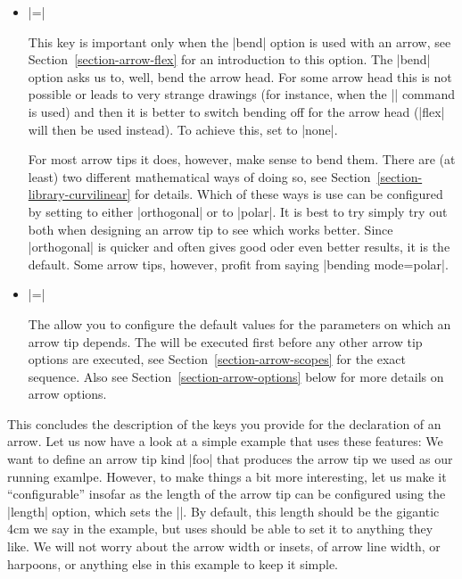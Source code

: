 \begin{command}{\pgfdeclarearrow{}}
\begin{itemize}
  \item {}|=|

    This key is important only when the |bend| option is used with an
    arrow, see Section~\ref{section-arrow-flex} for an introduction to
    this option. The |bend| option asks us to, well, bend the arrow
    head. For some arrow head this is not possible or leads to very
    strange drawings (for instance, when the |\pgftext| command is
    used) and then it is better to switch bending off for the arrow
    head (|flex| will then be used instead). To achieve this, set
     to |none|.

    For most arrow tips it does, however, make sense to bend
    them. There are (at least) two different mathematical ways of
    doing so, see Section~\ref{section-library-curvilinear} for details. Which of
    these ways is use can be configured by setting  to
    either |orthogonal| or to |polar|. It is best to try simply try
    out both when designing an arrow tip to see which works
    better. Since |orthogonal| is quicker and often gives good oder
    even better results, it is the default. Some arrow tips, however,
    profit from saying |bending mode=polar|.

  \item {}|=|

    The  allow you to configure the default values
    for the parameters on which an arrow tip depends. The  will be executed first before any other arrow tip options
    are executed, see Section~\ref{section-arrow-scopes} for the exact
    sequence. Also see Section~\ref{section-arrow-options} below for
    more details on arrow options.
  \end{itemize}

  This concludes the description of the keys you provide for the
  declaration of an arrow. Let us now have a look at a simple example
  that uses these features: We want to define an arrow tip kind |foo|
  that produces the arrow tip we used as our running examlpe. However,
  to make things a bit more interesting, let us make it
  ``configurable'' insofar as the length of the arrow tip can be
  configured using the |length| option, which sets the
  |\pgfarrowlength|. By default, this length should be the gigantic
  4cm we say in the example, but uses should be able to set it to
  anything they like. We will not worry about the arrow width or
  insets, of arrow line width, or harpoons, or anything else in this
  example to keep it simple.


\end{command}

